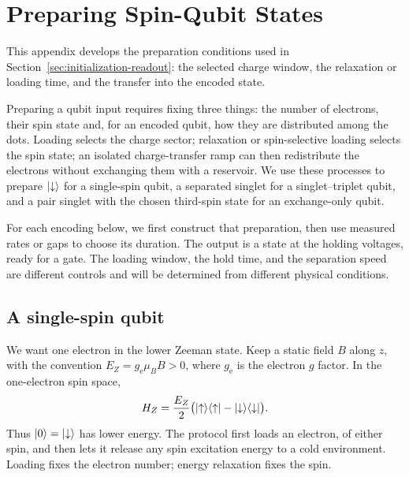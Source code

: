 \FloatBarrier
\section{Preparing Spin-Qubit States}
\label{app:state-preparation}
\label{sec:initialization-calibration}

This appendix develops the preparation conditions used in
Section~\ref{sec:initialization-readout}: the selected charge window,
the relaxation or loading time, and the transfer into the encoded state.

Preparing a qubit input requires fixing three things: the number of
electrons, their spin state and, for an encoded qubit, how they are
distributed among the dots. Loading selects the charge sector;
relaxation or spin-selective loading selects the spin state; an
isolated charge-transfer ramp can then redistribute the electrons
without exchanging them with a reservoir. We use these processes to
prepare $\lvert \downarrow\rangle$ for a single-spin qubit, a separated
singlet for a singlet--triplet qubit, and a pair singlet with the
chosen third-spin state for an exchange-only qubit.

For each encoding below, we first construct that preparation, then
use measured rates or gaps to choose its duration. The output is a
state at the holding voltages, ready for a gate. The loading window,
the hold time, and the separation speed are different controls and
will be determined from different physical conditions.

\subsection{A single-spin qubit}
\label{sec:calibration-single-spin-initialization}

We want one electron in the lower Zeeman state. Keep a static field
$B$ along $z$, with the convention $E_Z=g_{\mathrm e}\mu_BB>0$,
where $g_{\mathrm e}$ is the electron $g$ factor. In the
one-electron spin space,
\begin{equation}
 H_Z=\frac{E_Z}{2}
   \bigl(\ket{\uparrow}\bra{\uparrow}
         -\ket{\downarrow}\bra{\downarrow}\bigr).
 \label{eq:calibration-initialization-zeeman}
\end{equation}
Thus $\lvert 0\rangle=\lvert \downarrow\rangle$ has lower energy. The protocol first
loads an electron, of either spin, and then lets it release any
spin excitation energy to a cold environment. Loading fixes the
electron number; energy relaxation fixes the spin.

